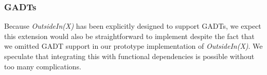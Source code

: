 \subsubsection{GADTs}

Because \textit{OutsideIn(X)} has been explicitly designed to support GADTs, we expect
this extension would also be straightforward to implement despite the fact that
we omitted GADT support in our prototype implementation of \textit{OutsideIn(X)}. We
speculate that integrating this with functional dependencies is possible
without too many complications.
